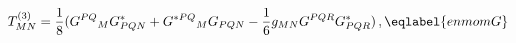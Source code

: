 \begin{equation}
T^{(3)}_{MN}=
       \frac 18(G^{PQ}{}_MG^*_{PQN}+G^{*PQ}{}_MG_{PQN}-
        \frac 16 g_{MN} G^{PQR}G^*_{PQR})\,,
\eqlabel{enmomG}
\end{equation}

